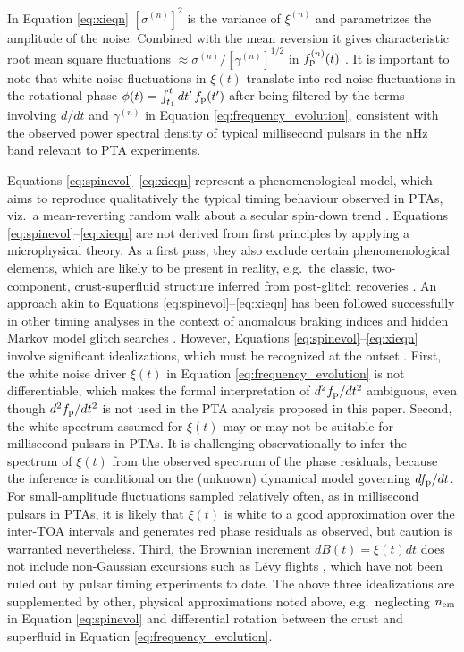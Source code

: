 \documentclass[fleqn,usenatbib,useAMS]{mnras}
\begin{document}
In Equation \eqref{eq:xieqn} $[\sigma^{(n)}]^2$ is the variance of $\xi^{(n)}$ and parametrizes the amplitude of the noise. Combined with the mean reversion it gives characteristic root mean square fluctuations $\approx \sigma^{(n)} / [\gamma^{(n)}]^{1/2}$ in $f_{\rm p}^{(n)}(t)$ \citep{gardiner2009stochastic}. It is important to note that white noise fluctuations in $\xi(t)$ translate into red noise fluctuations in the rotational phase $\phi(t) = \int_{t_1}^t dt' \, f_{\rm p}(t')$ after being filtered by the terms involving $d/dt$ and $\gamma^{(n)}$ in Equation \eqref{eq:frequency_evolution}, consistent with the observed power spectral density of typical millisecond pulsars in the nHz band relevant to PTA experiments. \newline 


Equations \eqref{eq:spinevol}--\eqref{eq:xieqn} represent a phenomenological model, which aims to reproduce qualitatively the typical timing behaviour observed in PTAs, viz.\ a mean-reverting random walk about a secular spin-down trend \citep{NANOgrav2023,EPTA2023,Zic2023arXiv230616230Z}. Equations \eqref{eq:spinevol}--\eqref{eq:xieqn} are not derived from first principles by applying a microphysical theory. As a first pass, they also exclude certain phenomenological elements, which are likely to be present in reality, e.g.\ the classic, two-component, crust-superfluid structure inferred from post-glitch recoveries \citep{Baym1969,vanEysden,Alpar2017MNRAS.471.4827G,Myers2021MNRAS.502.3113M,Meyers2021}. An approach akin to Equations \eqref{eq:spinevol}--\eqref{eq:xieqn} has been followed successfully in other timing analyses in the context of anomalous braking indices \citep{Vargas} and hidden Markov model glitch searches \citep{Melatos2020ApJ...896...78M,Lower2021MNRAS.508.3251L,Dunn2022,Dunn2023MNRAS.522.5469D}. However, Equations \eqref{eq:spinevol}--\eqref{eq:xieqn}  involve significant idealizations, which must be recognized at the outset \citep{Meyers2021,Myers2021MNRAS.502.3113M,Vargas}. First, the white noise driver $\xi(t)$ in Equation \eqref{eq:frequency_evolution} is not differentiable, which makes the formal interpretation of $d^2 f_{\rm p} / dt^2$ ambiguous, even though $d^2 f_{\rm p} / dt^2$ is not used in the PTA analysis proposed in this paper. Second, the white spectrum assumed for $\xi(t)$ may or may not be suitable for millisecond pulsars in PTAs. It is challenging observationally to infer the spectrum of $\xi(t)$ from the observed spectrum of the phase residuals, because the inference is conditional on the (unknown) dynamical model governing $df_{\rm p}/dt$. For small-amplitude fluctuations sampled relatively often, as in millisecond pulsars in PTAs, it is likely that $\xi(t)$ is white to a good approximation over the inter-TOA intervals and generates red phase residuals as observed, but caution is warranted nevertheless. Third, the Brownian increment $dB(t)=\xi(t)dt$ does not include non-Gaussian excursions such as L\'{e}vy flights \citep{Sornette2004}, which have not been ruled out by pulsar timing experiments to date. The above three idealizations are supplemented by other, physical approximations noted above, e.g.\ neglecting $n_{\rm em}$ in Equation \eqref{eq:spinevol} and differential rotation between the crust and superfluid in Equation \eqref{eq:frequency_evolution}.
\end{document}
